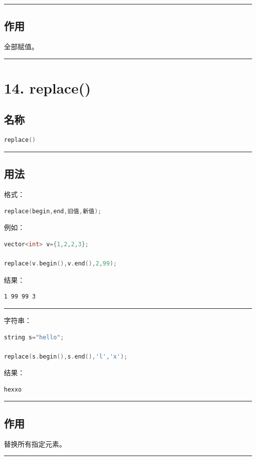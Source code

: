 \documentclass[10pt,twocolumn]{extarticle}
\begin{document}
\noindent\rule{\linewidth}{0.4pt}

\subsection{作用}
全部赋值。

\noindent\rule{\linewidth}{0.4pt}

\section{14. replace()}

\subsection{名称}
\begin{lstlisting}[language=C++]
replace()
\end{lstlisting}

\noindent\rule{\linewidth}{0.4pt}

\subsection{用法}
格式：
\begin{lstlisting}[language=C++]
replace(begin,end,旧值,新值);
\end{lstlisting}
例如：
\begin{lstlisting}[language=C++]
vector<int> v={1,2,2,3};

replace(v.begin(),v.end(),2,99);
\end{lstlisting}
结果：
\begin{lstlisting}
1 99 99 3
\end{lstlisting}

\noindent\rule{\linewidth}{0.4pt}

字符串：
\begin{lstlisting}[language=C++]
string s="hello";

replace(s.begin(),s.end(),'l','x');
\end{lstlisting}
结果：
\begin{lstlisting}
hexxo
\end{lstlisting}

\noindent\rule{\linewidth}{0.4pt}

\subsection{作用}
替换所有指定元素。

\noindent\rule{\linewidth}{0.4pt}
\end{document}
